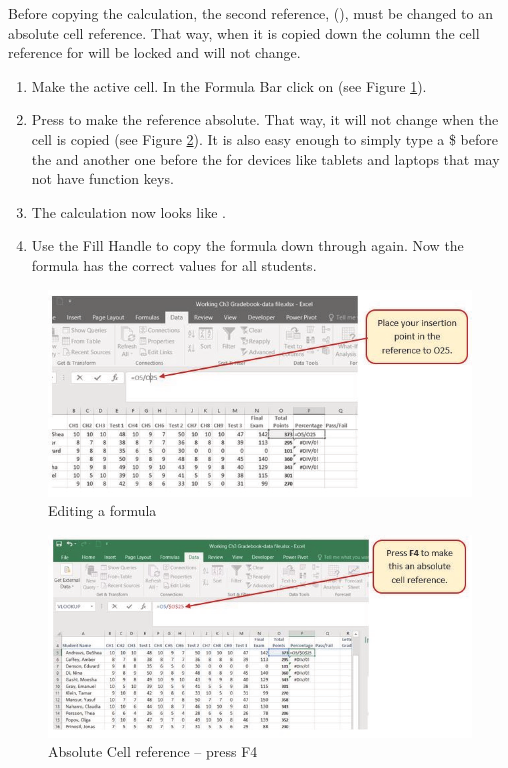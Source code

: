 Before copying the calculation, the second reference, (), must be changed to an absolute cell reference. That way, when it is copied down the column the cell reference for  will be locked and will not change.

\begin{enumerate}
	\item Make  the active cell. In the Formula Bar click on  (see Figure \ref{03:fig07}).
	\item Press  to make the  reference absolute. That way, it will not change when the cell is copied (see Figure \ref{03:fig08}). It is also easy enough to simply type a \$ before the  and another one before the  for devices like tablets and laptops that may not have function keys.
	\item The calculation now looks like .
	\item Use the Fill Handle to copy the formula down through  again. Now the formula has the correct values for all students.
\end{enumerate}

\begin{figure}[H]
	\centering
	\includegraphics[width=\maxwidth{.95\linewidth}]{gfx/ch03_fig07}
	\caption{Editing a formula}
	\label{03:fig07}
\end{figure}

\begin{figure}[H]
	\centering
	\includegraphics[width=\maxwidth{.95\linewidth}]{gfx/ch03_fig08}
	\caption{Absolute Cell reference – press F4}
	\label{03:fig08}
\end{figure}

